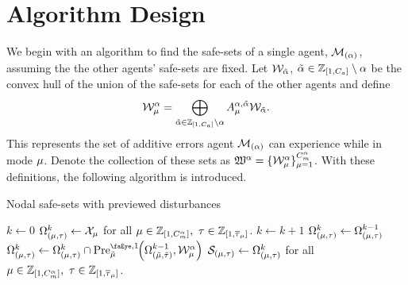 \section{Algorithm Design}
We begin with an algorithm to find the safe-sets of a single agent, $\mathcal{M}_{(\alpha)}$, assuming the the other agents' safe-sets are fixed. Let $\mathcal{W}_{\tilde{\alpha}}$, $\tilde{\alpha}\in\mathbb{Z}_{[1,{C_a}]}\setminus\alpha$ be the convex hull of the union of the safe-sets for each of the other agents and define 
\begin{equation}
\wcon[\agentidx][\modeidx]=\bigoplus_{\tilde{\agentidx}\in\int\rii{1}{\numagents}\setminus\agentidx}A_\modeidx^{\agentidx,\tilde{\agentidx}}\mathcal{W}_{\tilde{\agentidx}}.
\end{equation}
This represents the set of additive errors agent $\mathcal{M}_{(\alpha)}$ can experience while in mode ${\mu}$. Denote the collection of these sets as $\wconset{\agentidx}=\{\wcon[\agentidx][\modeidx]\}_{\modeidx=1}^{\nummodes[\agentidx]}$. With these definitions, the following algorithm is introduced. 
\begin{algorithm}[t]
\caption{Nodal safe-sets with previewed disturbances}\label{alg:node_safe_sets}
\begin{algorithmic}[1]
\State $k\gets0$
\State $\Omega_{(\modeidx,\sstimerval)}^k\gets\xcon[\modeidx]$ for all $\modeidx\in\int\rii{1}{\nummodes[\agentidx]},\ \sstimerval\in\int\rii{1}{\sstimermax{\modeidx}}$.
\Repeat 
	\State $k\gets k+1$
			\State $\Omega_{({\mu},\tau)}^k\gets\Omega_{({\mu},\tau)}^{k-1}$
			\For{$(\tilde{\modeidx},\tilde{\sstimerval})\in\sspairset{\modeidx}{\sstimerval}$}
				\State $\Omega_{(\modeidx,\sstimerval)}^k\gets\Omega_{(\modeidx,\sstimerval)}^k\cap\PreviewedPre[\tilde{\modeidx}][1]{\Omega_{(\tilde{\modeidx},\tilde{\sstimerval})}^{k-1}, \wcon[\agentidx][\modeidx]}$
			\EndFor
		\EndFor
	\EndFor
{}
$\mathcal{S}_{({\mu},\tau)}\gets\Omega_{({\mu},\tau)}^k$ for all $\modeidx\in\int\rii{1}{\nummodes[\agentidx]},\ \sstimerval\in\int\rii{1}{\sstimermax{\modeidx}}$.\;
\EndProcedure
\end{algorithmic}
\end{algorithm}


